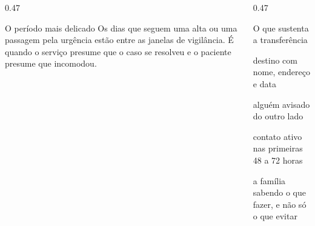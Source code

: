 \begin{frame}{}
\begin{center}
\end{center}

\CRvg
\begin{columns}[onlytextwidth, t]
\begin{column}{0.47\textwidth}
\begin{caixamudanca}{O per\'iodo mais delicado}
Os dias que seguem uma alta ou uma passagem pela urg\^encia est\~ao entre as
janelas de vigil\^ancia. \'E quando o servi\c{c}o presume que o caso se
resolveu e o paciente presume que incomodou.
\end{caixamudanca}
\end{column}
\calha
\begin{column}{0.47\textwidth}
\begin{caixaproteger}{O que sustenta a transfer\^encia}
\begin{itemc}
\item destino com nome, endere\c{c}o e data
\item algu\'em avisado do outro lado
\item contato ativo nas primeiras 48 a 72 horas
\item a fam\'ilia sabendo o que fazer, e n\~ao s\'o o que evitar
\end{itemc}
\end{caixaproteger}
\end{column}
\end{columns}
\end{frame}
